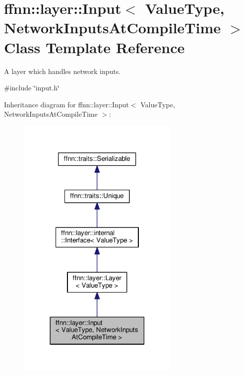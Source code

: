 \hypertarget{classffnn_1_1layer_1_1_input}{\section{ffnn\-:\-:layer\-:\-:Input$<$ Value\-Type, Network\-Inputs\-At\-Compile\-Time $>$ Class Template Reference}
\label{classffnn_1_1layer_1_1_input}
}


A layer which handles network inputs.  




{\ttfamily \#include \char`\"{}input.\-h\char`\"{}}



Inheritance diagram for ffnn\-:\-:layer\-:\-:Input$<$ Value\-Type, Network\-Inputs\-At\-Compile\-Time $>$\-:\nopagebreak
\begin{figure}[H]
\begin{center}
\leavevmode
\includegraphics[width=222pt]{classffnn_1_1layer_1_1_input__inherit__graph}
\end{center}
\end{figure}


